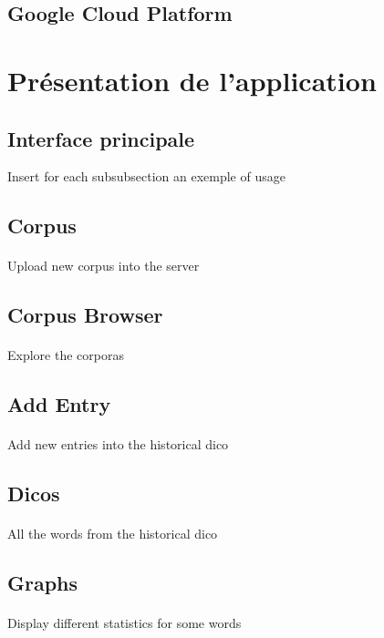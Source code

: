 \documentclass[]{report}
\begin{document}
\subsection{Google Cloud Platform}

\section{Présentation de l'application}
	\subsection{Interface principale}
	Insert for each subsubsection an exemple of usage 
	\subsection{Corpus}
		\paragraph{}
		Upload new corpus into the server
	\subsection{Corpus Browser}
		\paragraph{}
		Explore the corporas
	\subsection{Add Entry}
		\paragraph{}
		Add new entries into the historical dico
	\subsection{Dicos}
		\paragraph{}
		All the words from the historical dico
	\subsection{Graphs}
		\paragraph{}
		Display different statistics for some words
\end{document}
